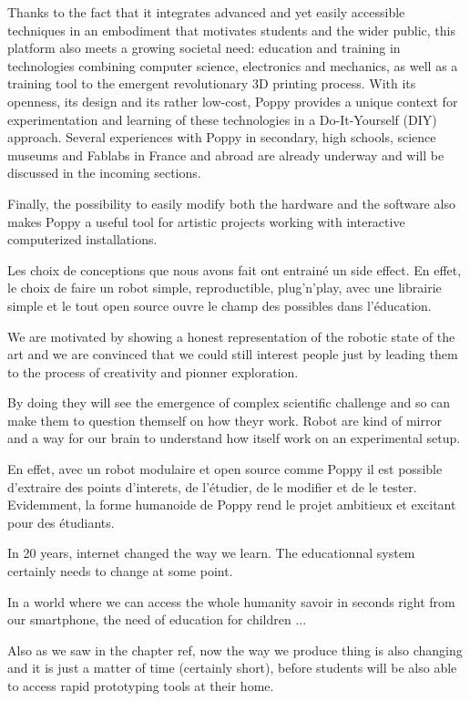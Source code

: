 Thanks to the fact that it integrates advanced and yet easily accessible techniques in an embodiment that motivates students and the wider public, this platform also meets a growing societal need: education and training in technologies combining computer science, electronics and mechanics, as well as a training tool to the emergent revolutionary 3D printing process. With its openness, its design and its rather low-cost, Poppy provides a unique context for experimentation and learning of these technologies in a Do-It-Yourself (DIY) approach. Several experiences with Poppy in secondary, high schools, science museums and Fablabs in France and abroad are already underway and will be discussed in the incoming sections.

Finally, the possibility to easily modify both the hardware and the software also makes Poppy a useful tool for artistic projects working with interactive computerized installations.


Les choix de conceptions que nous avons fait ont entrainé un side effect. En effet, le choix de faire un robot simple, reproductible, plug'n'play, avec une librairie simple et le tout open source ouvre le champ des possibles dans l'éducation.

We are motivated by showing a honest representation of the robotic state of the art and we are convinced that we could still interest people just by leading them to the process of creativity and pionner exploration.

By doing they will see the emergence of complex scientific challenge and so can make them to question themself on how theyr work. Robot are kind of mirror and a way for our brain to understand how itself work on an experimental setup.



En effet, avec un robot modulaire et open source comme Poppy il est possible d'extraire des points d'interets, de l'étudier, de le modifier et de le tester. Evidemment, la forme humanoide de Poppy rend le projet ambitieux et excitant pour des étudiants.


In 20 years, internet changed the way we learn. The educationnal system certainly needs to change at some point.

In a world where we can access the whole humanity savoir in seconds right from our smartphone, the need of education for children ...

Also as we saw in the chapter ref, now the way we produce thing is also changing and it is just a matter of time (certainly short), before students will be also able to access rapid prototyping tools at their home.

